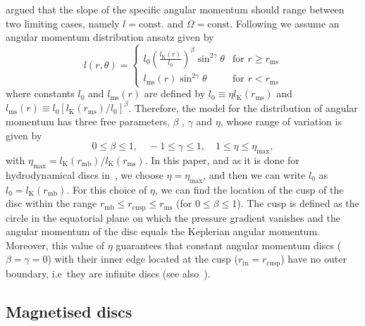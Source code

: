 \documentclass[referee]{aa}
\begin{document}
\cite{Jaroszynski:1980} argued that the slope of the specific angular momentum should range between two limiting cases, namely $l = \mathrm{const.}$ and $\Omega = \mathrm{const}$. Following \citet{Qian:2009} we assume an angular momentum distribution ansatz given by  
\begin{equation}
l (r,\theta) = \left\{ \label{eq:ansatz} 
  \begin{array}{lr}
    l_0 \left(\frac{l_{\mathrm{K}}(r)}{l_0}\right)^{\beta}\sin^{2\gamma}{\theta} &  \text{for } r \geq r_{\mathrm{ms}}\\
    l_{\mathrm{ms}}(r)\sin^{2\gamma}{\theta} & \text{for } r < r_{\mathrm{ms}}
  \end{array}
\right.
\end{equation}
where constants $l_0$ and $l_{\mathrm{ms}}(r)$ are defined by $l_0 \equiv \eta l_{\mathrm{K}}(r_{\mathrm{ms}})$ and $l_{\mathrm{ms}}(r) \equiv l_0 [l_{\mathrm{K}}(r_{\mathrm{ms}})/l_0]^{\beta}$. Therefore, the model for the distribution of angular momentum has three free parameters, $\beta$ , $\gamma$ and $\eta$, whose range of variation is given by~\citep{Qian:2009}
\begin{equation}
0 \leq \beta \leq 1, \quad -1 \leq \gamma \leq 1, \quad 1 \leq \eta \leq \eta_{\mathrm{max}},
\end{equation}
with $\eta_{\mathrm{max}} = l_{\mathrm{K}}(r_{\mathrm{mb}})/l_{\mathrm{K}}(r_{\mathrm{ms}})$. In this paper, and as it is done for hydrodynamical discs in~\citet{Qian:2009}, we choose $\eta = \eta_{\mathrm{max}}$, and then we can write $l_0$ as $l_0 = l_{\mathrm{K}}(r_{\mathrm{mb}})$. For this choice of $\eta$, we can find the location of the cusp of the disc  within the range $r_{\mathrm{mb}} \leq r_{\mathrm{cusp}} \leq r_{\mathrm{ms}}$ (for $0 \leq \beta \leq 1$). The cusp is defined as the circle in the equatorial plane on which the pressure gradient vanishes and the angular momentum of the disc equals the Keplerian angular momentum. Moreover, this value of $\eta$ guarantees that constant angular momentum discs ($\beta = \gamma = 0$) with their inner edge located at the cusp ($r_{\mathrm{in}} = r_{\mathrm{cusp}}$) have no outer boundary, i.e~they are infinite discs (see also~\cite{Font:2002}). 

\subsection{Magnetised discs}
\end{document}
